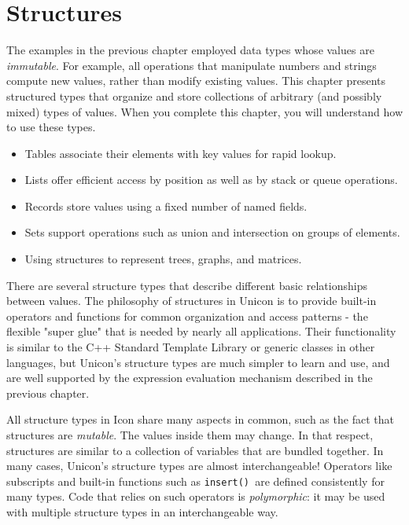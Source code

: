 \chapter{Structures}

The examples in the previous chapter employed data types whose values
are \textit{immutable}. For example, all operations that manipulate
numbers and strings compute new values, rather than modify existing
values. This chapter presents structured types that organize and store
collections of arbitrary (and possibly mixed) types of values. When you
complete this chapter, you will understand how to use these types.
\begin{itemize}
  \item Tables associate their elements with key values for rapid lookup.
  \item Lists offer efficient access by position as well as by
    stack or queue operations.
  \item Records store values using a fixed number of named fields.
  \item Sets support operations such as union and intersection on groups
    of elements.
  \item Using structures to represent trees, graphs, and
    matrices.
\end{itemize}
There are several structure types that describe different basic
relationships between values. The philosophy of structures in Unicon is
to provide built-in operators and functions for common organization and
access patterns - the flexible "super glue"
that is needed by nearly all applications. Their functionality is
similar to the C++ Standard Template Library or generic classes in
other languages, but Unicon's structure types are much
simpler to learn and use, and are well supported by the expression
evaluation mechanism described in the previous chapter.

All structure types in Icon share many aspects in common, such as the
fact that structures are \textit{mutable}. The
values inside them may change. In that respect, structures are similar
to a collection of variables that are bundled together. In many cases,
Unicon's structure types are almost interchangeable!
Operators like subscripts and built-in functions such as
\texttt{insert()}\texttt{ }are defined consistently for
many types. Code that relies on such operators is
\textit{polymorphic}: it may be used with multiple
structure types in an interchangeable way.

